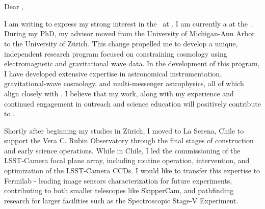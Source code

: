 \documentclass[10.5pt]{article}
\begin{document}
\begin{flushright}
\textbf{\ApplicantName}\\ 
\ApplicantInstitutionNameOne\\
\ApplicantInstitutionNameTwo\\
\ApplicantInstitutionAddressLine\\ \ApplicantInstitutionCityLine\\
\end{flushright}

\vspace{0.25em}
\RecipientNameOne \hfill \LetterDate \\
\RecipientInstitution \\

Dear \RecipientNameTwo,

\vspace{0.5em}

I am writing to express my strong interest in the \PositionTitle\ at \RecipientInstitution. 
I am currently a \ApplicantTitle at the \ApplicantInstitutionNameTwo.
During my PhD, my advisor moved from the University of Michigan-Ann Arbor to the University of Zürich. This change propelled me to develop a unique, independent research program focused on constraining cosmology using electromagnetic and gravitational wave data. 
In the development of this program, I have developed extensive expertise in astronomical instrumentation, gravitational-wave cosmology, and multi-messenger astrophysics, all of which align closely with \HostGroupDescriptor. I believe that my work, along with my experience and continued engagement in outreach and science education will positively contribute to \RecipientInstitution.

Shortly after beginning my studies in Zürich, I moved to La Serena, Chile to support the Vera C. Rubin Observatory through the final stages of construction and early science operations.
While in Chile, I led the commissioning of the LSST-Camera focal plane array, including routine operation, intervention, and optimization of the LSST-Camera CCDs. 
\textcolor{\tcolor}{I would like to transfer this expertise to Fermilab - leading image sensors characterization for future experiments, contributing to both smaller telescopes like SkipperCam, and pathfinding research for larger facilities such as the Spectroscopic Stage-V Experiment.}
\end{document}

